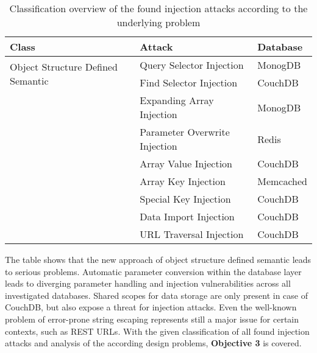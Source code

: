 \begin{table}[h]
  \sffamily
  \centering 
  \begin{tabular}{lll}
  \textbf{Class} & \textbf{Attack} & \textbf{Database} \\ \hline
  \multirow{2}{*}{Object Structure Defined Semantic}
    & Query Selector Injection & MonogDB \\
    & Find Selector Injection & CouchDB \\ \hdashline
  \multirow{4}{*}{Diverging Parameter Handling}
    & Expanding Array Injection & MonogDB \\
    & Parameter Overwrite Injection & Redis \\
    & Array Value Injection & CouchDB \\
    & Array Key Injection & Memcached \\ \hdashline
  \multirow{2}{*}{Shared Scope for Data}
    & Special Key Injection & CouchDB \\
    & Data Import Injection & CouchDB \\ \hdashline
  \multirow{1}{*}{Error-prone String Escaping}
    & URL Traversal Injection & CouchDB \\ \hline
  \end{tabular}
  \caption{Classification overview of the found injection attacks according to the underlying problem}
  \label{tab:attack_classification_overview}
\end{table}

The table shows that the new approach of object structure defined semantic leads to serious problems. Automatic parameter conversion within the database layer leads to diverging parameter handling and injection vulnerabilities across all investigated databases. Shared scopes for data storage are only present in case of CouchDB, but also expose a threat for injection attacks. Even the well-known problem of error-prone string escaping represents still a major issue for certain contexts, such as REST URLs. With the given classification of all found injection attacks and analysis of the according design problems, \textbf{Objective 3} is covered.